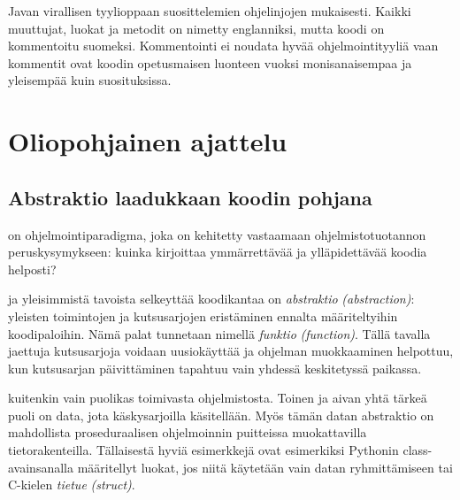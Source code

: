 \documentclass{tufte-book}
\newcommand{\eng}[1]{\textit{(#1)}}
\newcommand{\new}[1]{\textit{\gls{#1}}}
\newcommand{\neweng}[2]{\new{#1} \eng{#2}}
\begin{document}
 Javan virallisen tyylioppaan suosittelemien
ohjelinjojen mukaisesti. Kaikki muuttujat, luokat ja metodit on nimetty englanniksi, mutta koodi
on kommentoitu suomeksi. Kommentointi ei noudata hyvää ohjelmointityyliä vaan kommentit ovat
koodin opetusmaisen luonteen vuoksi monisanaisempaa ja yleisempää kuin suosituksissa.


\chapter{Oliopohjainen ajattelu}
\label{olioista}


\section{Abstraktio laadukkaan koodin pohjana}
\label{abstraktiosta}

 on ohjelmointiparadigma, joka on kehitetty vastaamaan
ohjelmistotuotannon peruskysymykseen: kuinka kirjoittaa ymmärrettävää ja ylläpidettävää koodia
helposti?

 ja yleisimmistä tavoista selkeyttää koodikantaa on
\neweng{abstraktio}{abstraction}: yleisten toimintojen ja kutsusarjojen eristäminen ennalta
määriteltyihin koodipaloihin. Nämä palat tunnetaan nimellä \neweng{funktio}{function}. Tällä
tavalla jaettuja kutsusarjoja voidaan uusiokäyttää ja ohjelman muokkaaminen helpottuu, kun
kutsusarjan päivittäminen tapahtuu vain yhdessä keskitetyssä paikassa.

 kuitenkin vain puolikas toimivasta ohjelmistosta. Toinen ja aivan
yhtä tärkeä puoli on data, jota käskysarjoilla käsitellään. Myös tämän datan abstraktio on
mahdollista proseduraalisen ohjelmoinnin puitteissa muokattavilla tietorakenteilla. Tällaisestä
hyviä esimerkkejä ovat esimerkiksi Pythonin class-avainsanalla määritellyt luokat, jos niitä
käytetään vain datan ryhmittämiseen tai C-kielen \neweng{tietue}{struct}.
\end{document}
